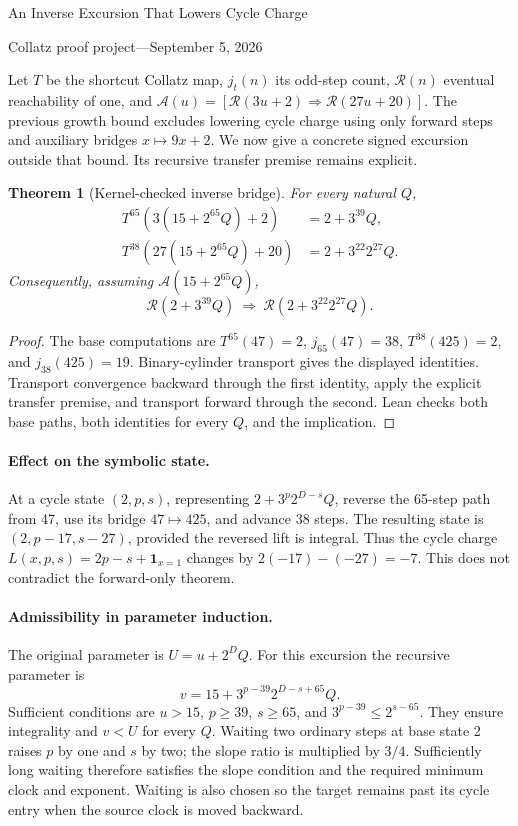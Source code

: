 \documentclass[10pt]{article}
\newtheorem{theorem}{Theorem}
\newcommand{\R}{\mathcal R}
\newcommand{\A}{\mathcal A}
\begin{document}
\begin{center}
{\Large An Inverse Excursion That Lowers Cycle Charge}\par\medskip
Collatz proof project\quad---\quad September 5, 2026
\end{center}
Let $T$ be the shortcut Collatz map, $j_t(n)$ its odd-step count,
$\R(n)$ eventual reachability of one, and
$\A(u)=[\R(3u+2)\Rightarrow\R(27u+20)]$.
The previous growth bound excludes lowering cycle charge using only forward
steps and auxiliary bridges $x\mapsto9x+2$. We now give a concrete signed
excursion outside that bound. Its recursive transfer premise remains explicit.

\begin{theorem}[Kernel-checked inverse bridge]
For every natural $Q$,
\begin{align*}
T^{65}(3(15+2^{65}Q)+2)&=2+3^{39}Q,\\
T^{38}(27(15+2^{65}Q)+20)&=2+3^{22}2^{27}Q.
\end{align*}
Consequently, assuming $\A(15+2^{65}Q)$,
\[
 \R(2+3^{39}Q)\ \Longrightarrow\ \R(2+3^{22}2^{27}Q).
\]
\end{theorem}
\begin{proof}
The base computations are
$T^{65}(47)=2$, $j_{65}(47)=38$,
$T^{38}(425)=2$, and $j_{38}(425)=19$.
Binary-cylinder transport gives the displayed identities.
Transport convergence backward through the first identity, apply the explicit
transfer premise, and transport forward through the second.
Lean checks both base paths, both identities for every $Q$, and the implication.
\end{proof}

\paragraph{Effect on the symbolic state.}
At a cycle state $(2,p,s)$, representing $2+3^p2^{D-s}Q$, reverse the
65-step path from 47, use its bridge $47\mapsto425$, and advance 38 steps.
The resulting state is $(2,p-17,s-27)$, provided the reversed lift is integral.
Thus the cycle charge $L(x,p,s)=2p-s+\mathbf1_{x=1}$ changes by
$2(-17)-(-27)=-7$. This does not contradict the forward-only theorem.

\paragraph{Admissibility in parameter induction.}
The original parameter is $U=u+2^D Q$.
For this excursion the recursive parameter is
\[
 v=15+3^{p-39}2^{D-s+65}Q.
\]
Sufficient conditions are $u>15$, $p\geq39$, $s\geq65$, and
$3^{p-39}\leq2^{s-65}$. They ensure integrality and $v<U$ for every $Q$.
Waiting two ordinary steps at base state 2 raises $p$ by one and $s$ by two;
the slope ratio is multiplied by $3/4$. Sufficiently long waiting therefore
satisfies the slope condition and the required minimum clock and exponent.
Waiting is also chosen so the target remains past its cycle entry when the
source clock is moved backward.
\end{document}
